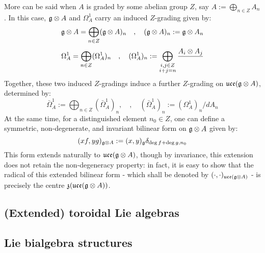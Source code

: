         More can be said when $A$ is graded by some abelian group $Z$, say $A := \bigoplus_{n \in Z} A_n$. In this case, $\g \tensor A$ and $\Omega^1_A$ carry an induced $Z$-grading given by:
            $$\g \tensor A = \bigoplus_{n \in Z} (\g \tensor A)_n \quad, \quad (\g \tensor A)_n := \g \tensor A_n$$
            $$\Omega^1_A = \bigoplus_{n \in Z} (\Omega^1_A)_n \quad, \quad (\Omega^1_A)_n := \bigoplus_{ \substack{i, j \in Z\\i + j = n} } \frac{A_i \tensor A_j}{}$$
        Together, these two induced $Z$-gradings induce a further $Z$-grading on $\uce(\g \tensor A)$, determined by:
            $$\bar{\Omega}^1_A := \bigoplus_{n \in Z} ( \bar{\Omega}^1_A )_n, \quad, \quad ( \bar{\Omega}^1_A )_n := ( \Omega^1_A )_n/dA_n$$
        At the same time, for a distinguished element $n_0 \in Z$, one can define a symmetric, non-degenerate, and invariant bilinear form on $\g \tensor A$ given by:
            $$(x f, y g)_{\g \tensor A} := (x, y)_{\g} \delta_{ \deg f + \deg g, n_0 }$$
        This form extends naturally to $\uce(\g \tensor A)$, though by invariance, this extension does not retain the non-degeneracy property: in fact, it is easy to show that the radical of this extended bilinear form - which shall be denoted by $(\cdot, \cdot)_{\uce(\g \tensor A)}$ - is precisely the centre $\z( \uce(\g \tensor A) )$.

    \subsection{(Extended) toroidal Lie algebras}

    \subsection{Lie bialgebra structures}